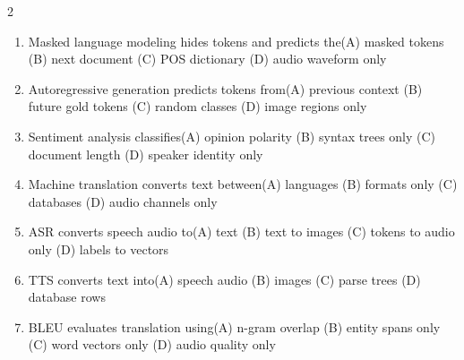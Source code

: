 \documentclass[a4paper]{article}
\begin{document}
\begin{multicols*}{2}
\begin{enumerate}[resume]
\item Masked language modeling hides tokens and predicts the\newline\hspace*{0.6em}(A) masked tokens \quad (B) next document \newline\hspace*{0.6em}(C) POS dictionary \quad (D) audio waveform only
\item Autoregressive generation predicts tokens from\newline\hspace*{0.6em}(A) previous context \quad (B) future gold tokens \newline\hspace*{0.6em}(C) random classes \quad (D) image regions only
\item Sentiment analysis classifies\newline\hspace*{0.6em}(A) opinion polarity \quad (B) syntax trees only \newline\hspace*{0.6em}(C) document length \quad (D) speaker identity only
\item Machine translation converts text between\newline\hspace*{0.6em}(A) languages \quad (B) formats only \newline\hspace*{0.6em}(C) databases \quad (D) audio channels only
\item ASR converts speech audio to\newline\hspace*{0.6em}(A) text \quad (B) text to images \newline\hspace*{0.6em}(C) tokens to audio only \quad (D) labels to vectors
\item TTS converts text into\newline\hspace*{0.6em}(A) speech audio \quad (B) images \newline\hspace*{0.6em}(C) parse trees \quad (D) database rows
\item BLEU evaluates translation using\newline\hspace*{0.6em}(A) n-gram overlap \quad (B) entity spans only \newline\hspace*{0.6em}(C) word vectors only \quad (D) audio quality only

\end{enumerate}
\end{multicols*}
\end{document}
